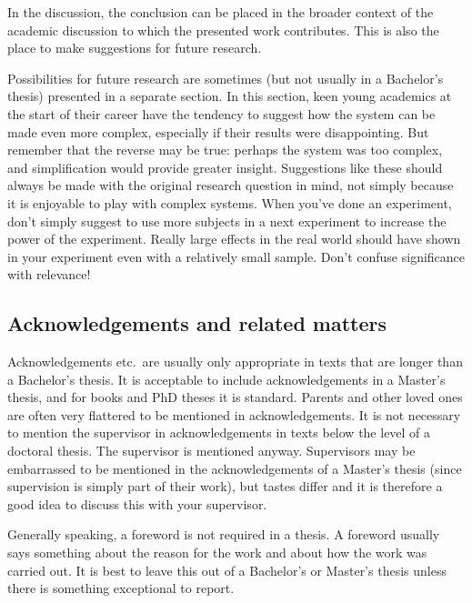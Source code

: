 In the discussion, the conclusion can be placed in the broader context of the academic discussion to which the presented work contributes.
This is also the place to make suggestions for future research.

Possibilities for future research are sometimes (but not usually in a Bachelor's thesis) presented in a separate section.
In this section, keen young academics at the start of their career have the tendency to suggest how the system can be made even more complex, especially if  their results were disappointing.
But remember that the reverse may be true: perhaps the system was too complex, and simplification would provide greater insight.
Suggestions like these should always be made with the original research question in mind, not simply because it is enjoyable to play with complex systems.
When you've done an experiment, don't simply suggest to use more subjects in a next experiment to increase the power of the experiment.
Really large effects in the real world should have shown in your experiment even with a relatively small sample.
Don't confuse significance with relevance!

\subsection{Acknowledgements and related matters}\label{sec:_acknowledgements}
Acknowledgements etc.\ are usually only appropriate in texts that are longer than a Bachelor's thesis.
It is acceptable to include acknowledgements in a Master's thesis, and for books and PhD theses it is standard.
Parents and other loved ones are often very flattered to be mentioned in acknowledgements.
It is not necessary to mention the supervisor in acknowledgements in texts below the level of a doctoral thesis.
The supervisor is mentioned anyway.
Supervisors may be embarrassed to be mentioned in the acknowledgements of a Master's thesis (since supervision is simply part of their work), but tastes differ and it is therefore a good idea to discuss this with your supervisor.

Generally speaking, a foreword is not required in a thesis.
A foreword usually says something about the reason for the work and about how the work was carried out.
It is best to leave this out of a Bachelor's or Master's thesis unless there is something exceptional to report.

